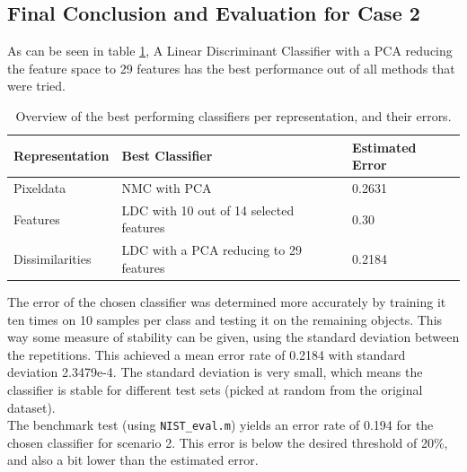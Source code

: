 \subsection{Final Conclusion and Evaluation for Case 2}
As can be seen in table \ref{tab:concase2}, A Linear Discriminant Classifier with a PCA reducing the feature space to 29 features has the best performance out of all methods that were tried.
\begin{table}[H]
	\centering
	\caption{Overview of the best performing classifiers per representation, and their errors.}
	\label{tab:concase2}
	\begin{tabular}{l|ll}
		Representation  & Best Classifier               & Estimated Error \\ \hline
		Pixeldata       & NMC with PCA &   0.2631        \\
		Features        & LDC with 10 out of 14 selected features                      & 0.30          \\
		Dissimilarities & LDC with a PCA reducing to 29 features                       &  0.2184        
	\end{tabular}
\end{table}
\noindent The error of the chosen classifier was determined more accurately by training it ten times on 10 samples per class and testing it on the remaining objects. This way some measure of stability can be given, using the standard deviation between the repetitions. This achieved a mean error rate of 0.2184 with standard deviation 2.3479e-4. The standard deviation is very small, which means the classifier is stable for different test sets (picked at random from the original dataset).\\
The benchmark test (using \texttt{NIST\_eval.m}) yields an error rate of 0.194 for the chosen classifier for scenario 2. This error is below the desired threshold of 20\%, and also a bit lower than the estimated error.